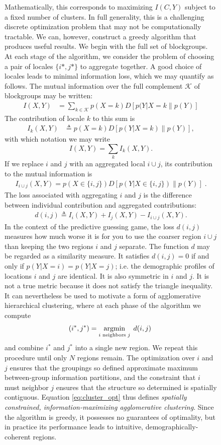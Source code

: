 \documentclass[english]{scrartcl}
\begin{document}
\begin{figure}
	Mathematically, this corresponds to maximizing $I(C,Y)$ subject to a fixed number of clusters. In full generality, this is a challenging discrete optimization problem that may not be computationally tractable. We can, however, construct a greedy algorithm that produces useful results. We begin with the full set of blockgroups. At each stage of the algorithm, we consider the problem of choosing a pair of locales $\{i*, j*\}$ to aggregate together. A good choice of locales leads to minimal information loss, which we may quantify as follows. The mutual information over the full complement $\mathcal{K}$ of blockgroups may be written: 
	\begin{align*}
	 	I(X,Y) &= \sum_{k \in \mathcal{K}} p(X = k) D[p(Y|X = k\|p(Y)] 
	\end{align*} 
	The contribution of locale $k$ to this sum is 
	\begin{align*}
		I_{k}(X,Y) &\triangleq p(X = k)D[p(Y|X = k)\|p(Y)], 
	\end{align*}
	with which notation we may write 
	\begin{equation*}
		I(X,Y) = \sum_{k} I_k(X,Y).
	\end{equation*}
	If we replace $i$ and $j$ with an aggregated local $i\cup j$, its contribution to the mutual information is 
	\begin{align*}
		I_{i\cup j}(X,Y) = p(X \in \{i,j\}) D[p(Y|X \in \{i,j\}) \| p(Y)]\;.
	\end{align*}
	The loss associated with aggregating $i$ and $j$ is the difference between individual contribution and  aggregated contributions:
	\begin{align*}
		d(i,j) \triangleq I_{i}(X,Y) + I_{j}(X,Y) - I_{i \cup j}(X,Y).  
	\end{align*}
	In the context of the predictive guessing game, the loss $d(i,j)$ measures how much worse it is for you to use the coarser region $i\cup j$ than keeping the two regions $i$ and $j$ separate. The function $d$ may be regarded as a similarity measure. It satisfies $d(i,j) = 0$ if and only if $p(Y|X = i) = p(Y|X = j)$; i.e. the demographic profiles of locations $i$ and $j$ are identical. It is also symmetric in $i$ and $j$. It is not a true metric because it does not satisfy the triangle inequality. It can nevertheless be used to motivate a form of agglomerative hierarchical clustering, where at each phase of the algorithm we compute 
	\begin{equation}
		(i^*, j^*) = \argmin_{i \text{ neighbors } j} \; d(i,j)\; \label{eq:cluster_opt}
	\end{equation}
	and combine $i^*$ and $j^*$ into a single new region. We repeat this procedure until only $N$ regions remain. The optimization over $i$ and $j$ ensures that the groupings so defined approximate maximum between-group information partitions, and the constraint that $i$ must neighbor $j$ ensures that the structure so determined is spatially contiguous. Equation \eqref{eq:cluster_opt} thus defines \emph{spatially constrained, information-maximizing agglomerative clustering}. Since the algorithm is greedy, it possesses no guarantees of optimality, but in practice its performance leads to intuitive, demographically-coherent regions. 


\end{figure}
\end{document}
